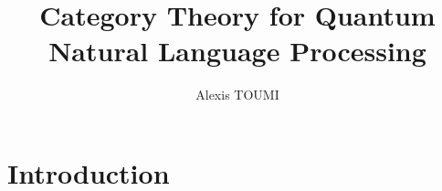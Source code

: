 

\title{Category Theory for Quantum\\
Natural Language Processing}
\author{Alexis TOUMI}

\degreedate{\today}





% 

\tableofcontents


\chapter*{Introduction}





